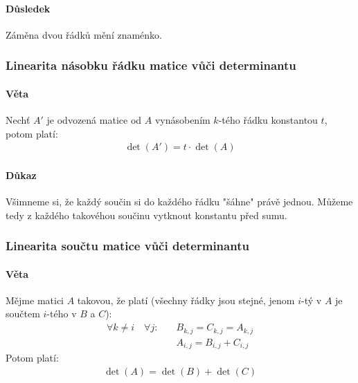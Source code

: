 \documentclass[a4paper,10pt]{article}
\begin{document}
\paragraph{Důsledek}
Záměna dvou řádků mění znaménko.

\subsubsection{Linearita násobku řádku matice vůči determinantu}
\setcounter{equation}{0}
\paragraph{Věta}
Nechť $A'$ je odvozená matice od $A$ vynásobením $k$-tého řádku
konstantou $t$, potom platí:
\begin{align*} 
	\det (A') = t \cdot \det (A)
\end{align*} 

\paragraph{Důkaz}
Všimneme si, že každý součin si do každého řádku "šáhne" právě jednou. Můžeme
tedy z každého takovéhou součinu vytknout konstantu před sumu.

\subsubsection{Linearita součtu matice vůči determinantu}
\setcounter{equation}{0}
\paragraph{Věta}
Mějme matici $A$ takovou, že platí (všechny řádky jsou stejné, jenom $i$-tý v
$A$ je součtem $i$-tého v $B$ a $C$):
\begin{align*}
	\forall k \neq i \quad \forall j: \quad &B_{k,j} = C_{k,j} = A_{k,j}\\
					  			 & A_{i,j} = B_{i,j} + C_{i,j}
\end{align*}
Potom platí:
\begin{align*}
	\det(A) = \det(B) + \det(C)
\end{align*}
\end{document}
